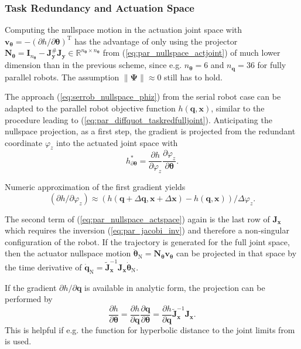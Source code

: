\documentclass[a4paper,twoside]{article}
\newcommand{\transp}[0]{{\mathrm{T}}}
\begin{document}
\subsubsection{Task Redundancy and Actuation Space}
\label{sec:parrob_taskred_actspace}

Computing the nullspace motion in the actuation joint space with $\bm{v}_{\bm{\theta}} = -(\partial h / \partial \bm{\theta})^\transp$ has the advantage of only using the projector $\bm{N}_{\bm{\theta}} = \bm{I}_{n_{\bm{\theta}}}-\bm{J}_{\bm{y}}^{\#}\bm{J}_{\bm{y}} \in \mathbb{R}^{n_{\bm{\theta}} \times n_{\bm{\theta}}}$ from (\ref{eq:par_nullspace_actjoint}) of much lower dimension than in the previous scheme, since e.g. $n_{\bm{\theta}}{=}6$ and $n_{\bm{q}}{=}36$ for fully parallel robots.
The assumption $\lVert\bm{\Psi}\rVert \approx 0$ still has to hold.

The approach (\ref{eq:serrob_nullspace_phiz}) from the serial robot case can be adapted to the parallel robot objective function $h(\bm{q},\bm{x})$, similar to the procedure leading to (\ref{eq:par_diffquot_taskredfulljoint}).
Anticipating the nullspace projection, as a first step, the gradient is projected from the redundant coordinate $\varphi_z$ into the actuated joint space with
\begin{equation}
h_{\partial \bm{\theta}}^{*} 
= 
\frac{\partial h}{\partial \varphi_z} 
\frac{\partial \varphi_z}{\partial \bm{\theta}}.
\label{eq:par_nullspace_actspace}
\end{equation}

Numeric approximation of the first gradient yields
%
\begin{equation}
(\partial h / \partial \varphi_z) \approx (h(\bm{q}+ \Delta \bm{q}, \bm{x} + \Delta \bm{x}) - h(\bm{q},\bm{x}))/\Delta \varphi_z.
\end{equation}

The second term of (\ref{eq:par_nullspace_actspace}) again is the last row of $\bm{J}_{\bm{x}}$ which requires the inversion (\ref{eq:par_jacobi_inv}) and therefore a non-singular configuration of the robot.
If the trajectory is generated for the full joint space, then the actuator nullspace motion $\ddot{\bm{\theta}}_\mathrm{N}=\bm{N}_{\bm{\theta}}\bm{v}_{\bm{\theta}}$ can be projected in that space by the time derivative of $\dot{\bm{q}}_\mathrm{N}=\tilde{\bm{J}}^{-1}_{\bm{x}}\bm{J}_{\bm{x}} \dot{\bm{\theta}}_\mathrm{N}$.

If the gradient $\partial h / \partial \bm{q}$ is available in analytic form, the projection can be performed by
\begin{equation}
\frac{\partial h}{\partial \bm{\theta}} 
= 
\frac{\partial h}{\partial \bm{q}}
\frac{\partial \bm{q}}{\partial \bm{\theta}}
= 
\frac{\partial h}{\partial \bm{q}}  \tilde{\bm{J}}_{\bm{x}}^{-1}\bm{J}_{\bm{x}}.
\end{equation}
This is helpful if e.g. the function for hyperbolic distance to the joint limits from \cite{ZhuQuCaoYan2013} is used.
\end{document}
